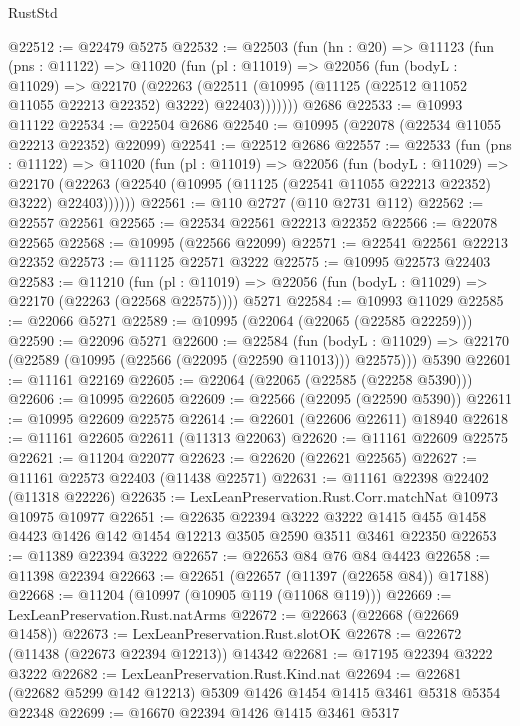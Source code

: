 \begin{lexlean}{RustStd}
\begin{coremodule}
@22512 := @22479 @5275
@22532 := @22503
    (fun (hn : @20) =>
    @11123
      (fun (pns : @11122) =>
      @11020
        (fun (pl : @11019) =>
        @22056
          (fun (bodyL : @11029) =>
          @22170
            (@22263
              (@22511 (@10995 (@11125 (@22512 @11052 @11055 @22213 @22352) @3222) @22403)))))))
    @2686
@22533 := @10993 @11122
@22534 := @22504 @2686
@22540 := @10995 (@22078 (@22534 @11055 @22213 @22352) @22099)
@22541 := @22512 @2686
@22557 := @22533
    (fun (pns : @11122) =>
    @11020
      (fun (pl : @11019) =>
      @22056
        (fun (bodyL : @11029) =>
        @22170 (@22263 (@22540 (@10995 (@11125 (@22541 @11055 @22213 @22352) @3222) @22403))))))
@22561 := @110 @2727 (@110 @2731 @112)
@22562 := @22557 @22561
@22565 := @22534 @22561 @22213 @22352
@22566 := @22078 @22565
@22568 := @10995 (@22566 @22099)
@22571 := @22541 @22561 @22213 @22352
@22573 := @11125 @22571 @3222
@22575 := @10995 @22573 @22403
@22583 := @11210
    (fun (pl : @11019) => @22056 (fun (bodyL : @11029) => @22170 (@22263 (@22568 @22575))))
    @5271
@22584 := @10993 @11029
@22585 := @22066 @5271
@22589 := @10995 (@22064 (@22065 (@22585 @22259)))
@22590 := @22096 @5271
@22600 := @22584
    (fun (bodyL : @11029) => @22170 (@22589 (@10995 (@22566 (@22095 (@22590 @11013))) @22575)))
    @5390
@22601 := @11161 @22169
@22605 := @22064 (@22065 (@22585 (@22258 @5390)))
@22606 := @10995 @22605
@22609 := @22566 (@22095 (@22590 @5390))
@22611 := @10995 @22609 @22575
@22614 := @22601 (@22606 @22611) @18940
@22618 := @11161 @22605 @22611 (@11313 @22063)
@22620 := @11161 @22609 @22575
@22621 := @11204 @22077
@22623 := @22620 (@22621 @22565)
@22627 := @11161 @22573 @22403 (@11438 @22571)
@22631 := @11161 @22398 @22402 (@11318 @22226)
@22635 := LexLeanPreservation.Rust.Corr.matchNat @10973 @10975 @10977
@22651 := @22635
    @22394
    @3222
    @3222
    @1415
    @455
    @1458
    @4423
    @1426
    @142
    @1454
    @12213
    @3505
    @2590
    @3511
    @3461
    @22350
@22653 := @11389 @22394 @3222
@22657 := @22653 @84 @76 @84 @4423
@22658 := @11398 @22394
@22663 := @22651 (@22657 (@11397 (@22658 @84)) @17188)
@22668 := @11204 (@10997 (@10905 @119 (@11068 @119)))
@22669 := LexLeanPreservation.Rust.natArms
@22672 := @22663 (@22668 (@22669 @1458))
@22673 := LexLeanPreservation.Rust.slotOK
@22678 := @22672 (@11438 (@22673 @22394 @12213)) @14342
@22681 := @17195 @22394 @3222 @3222
@22682 := LexLeanPreservation.Rust.Kind.nat
@22694 := @22681 (@22682 @5299 @142 @12213) @5309 @1426 @1454 @1415 @3461 @5318 @5354 @22348
@22699 := @16670 @22394 @1426 @1415 @3461 @5317

\end{coremodule}
\end{lexlean}
